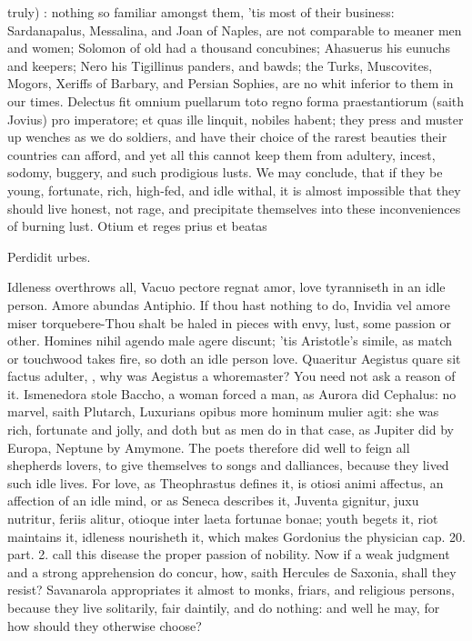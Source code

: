 {truly) :
nothing so familiar amongst them, 'tis most of their business:
Sardanapalus, Messalina, and Joan of Naples, are not comparable to
meaner men and women; Solomon of old had a thousand concubines;
Ahasuerus his eunuchs and keepers; Nero his Tigillinus panders, and
bawds; the Turks,  Muscovites, Mogors, Xeriffs of Barbary, and
Persian Sophies, are no whit inferior to them in our times. Delectus
fit omnium puellarum toto regno forma praestantiorum (saith Jovius) pro
imperatore; et quas ille linquit, nobiles habent; they press and muster
up wenches as we do soldiers, and have their choice of the rarest
beauties their countries can afford, and yet all this cannot keep them
from adultery, incest, sodomy, buggery, and such prodigious lusts. We
may conclude, that if they be young, fortunate, rich, high-fed, and
idle withal, it is almost impossible that they should live honest, not
rage, and precipitate themselves into these inconveniences of burning
lust.
Otium et reges prius et beatas

Perdidit urbes.

Idleness overthrows all, Vacuo pectore regnat amor, love tyranniseth in
an idle person. Amore abundas Antiphio. If thou hast nothing to
do, Invidia vel amore miser torquebere-Thou shalt be haled in
pieces with envy, lust, some passion or other. Homines nihil agendo
male agere discunt; 'tis Aristotle's simile, as match or
touchwood takes fire, so doth an idle person love. Quaeritur Aegistus
quare sit factus adulter, \etc{}, why was Aegistus a whoremaster? You need
not ask a reason of it. Ismenedora stole Baccho, a woman forced a man,
as Aurora did Cephalus: no marvel, saith Plutarch,
Luxurians opibus more hominum mulier agit: she was rich, fortunate and
jolly, and doth but as men do in that case, as Jupiter did by Europa,
Neptune by Amymone. The poets therefore did well to feign all shepherds
lovers, to give themselves to songs and dalliances, because they lived
such idle lives. For love, as Theophrastus defines it, is otiosi
animi affectus, an affection of an idle mind, or as Seneca
describes it, Juventa gignitur, juxu nutritur, feriis alitur, otioque
inter laeta fortunae bonae; youth begets it, riot maintains it,
idleness nourisheth it, \etc{} which makes  Gordonius the physician
cap. 20. part. 2. call this disease the proper passion of nobility. Now
if a weak judgment and a strong apprehension do concur, how, saith
Hercules de Saxonia, shall they resist? Savanarola appropriates it
almost to monks, friars, and religious persons, because they live
solitarily, fair daintily, and do nothing: and well he may, for how
should they otherwise choose?

}
